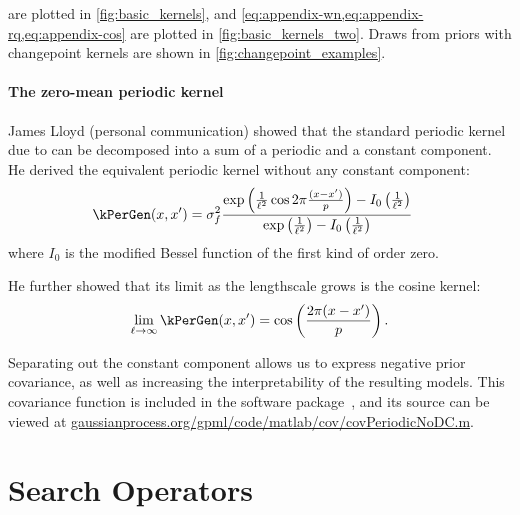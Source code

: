  are plotted in \cref{fig:basic_kernels}, and \cref{eq:appendix-wn,eq:appendix-rq,eq:appendix-cos} are plotted in \cref{fig:basic_kernels_two}.
Draws from \gp{} priors with changepoint kernels are shown in \cref{fig:changepoint_examples}.



\subsubsection{The zero-mean periodic kernel}

James Lloyd (personal communication) showed that the standard periodic kernel due to \citet{mackay1998introduction} can be decomposed into a sum of a periodic and a constant component.
He derived the equivalent periodic kernel without any constant component:
%
\begin{align}
\kPerGen(\inputVar, \inputVar') & =  \sigma_f^2 \frac{\exp\left(\frac{1}{\ell^2}\cos 2 \pi  \frac{(\inputVar - \inputVar')}{p}\right) - I_0\left(\frac{1}{\ell^2}\right)}{\exp\left(\frac{1}{\ell^2}\right) - I_0\left(\frac{1}{\ell^2}\right)} \label{eq:generalized-periodic}
\end{align}
%
where $I_0$ is the modified Bessel function of the first kind of order zero.

He further showed that its limit as the lengthscale grows is the cosine kernel:
%
\begin{equation}
\lim_{\ell \to \infty} \kPerGen(x, x') = \cos\left(\frac{2 \pi (x - x')}{p}\right).
\end{equation}

Separating out the constant component allows us to express negative prior covariance, as well as increasing the interpretability of the resulting models.
This covariance function is included in the \GPML{} software package~\citep{GPML}, and its source can be viewed at \url{gaussianprocess.org/gpml/code/matlab/cov/covPeriodicNoDC.m}.





\chapter{Search Operators}
\label{ch:appendix-search}
\label{sec:search-operators}



